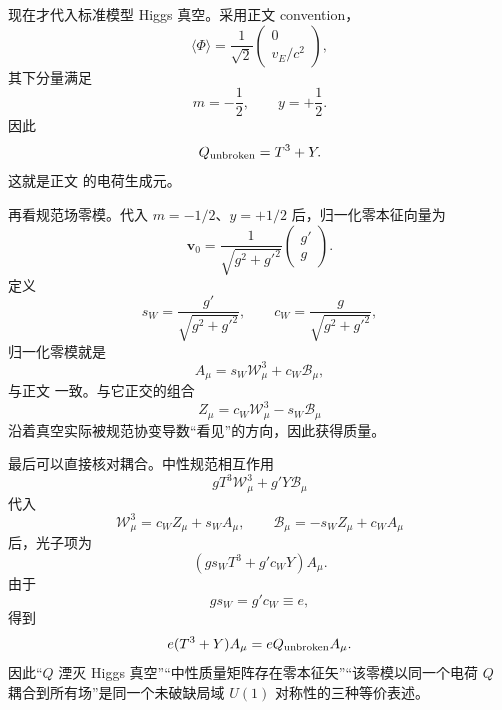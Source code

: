 \begin{derivation}
现在才代入标准模型 Higgs 真空。采用正文 convention，
\[
\langle\Phi\rangle
=
\frac1{\sqrt2}
\begin{pmatrix}0\\v_E/c^2\end{pmatrix},
\]
其下分量满足
\[
m=-\frac12,
\qquad
y=+\frac12.
\]
因此
\[
Q_{\rm unbroken}
=
T^3+Y.
\]
这就是正文 的电荷生成元。

再看规范场零模。代入 $m=-1/2$、$y=+1/2$ 后，归一化零本征向量为
\[
\mathbf v_0
=\frac1{\sqrt{g^2+g'^2}}
\begin{pmatrix}g'\\g\end{pmatrix}.
\]
定义
\[
s_W
=
\frac{g'}{\sqrt{g^2+g'^2}},
\qquad
c_W
=
\frac{g}{\sqrt{g^2+g'^2}},
\]
归一化零模就是
\[
A_\mu
=
s_W\mathcal W_\mu^3
+
c_W\mathcal B_\mu,
\]
与正文 一致。与它正交的组合
\[
Z_\mu
=
c_W\mathcal W_\mu^3
-
s_W\mathcal B_\mu
\]
沿着真空实际被规范协变导数“看见”的方向，因此获得质量。

最后可以直接核对耦合。中性规范相互作用
\[
gT^3\mathcal W_\mu^3
+
g'Y\mathcal B_\mu
\]
代入
\[
\mathcal W_\mu^3=c_WZ_\mu+s_WA_\mu,
\qquad
\mathcal B_\mu=-s_WZ_\mu+c_WA_\mu
\]
后，光子项为
\[
\left(
gs_WT^3+g'c_WY
\right)A_\mu.
\]
由于
\[
gs_W=g'c_W
\equiv e,
\]
得到
\[
e(T^3+Y)A_\mu
=
eQ_{\rm unbroken}A_\mu.
\]
因此“\(Q\) 湮灭 Higgs 真空”“中性质量矩阵存在零本征矢”“该零模以同一个电荷 \(Q\) 耦合到所有场”是同一个未破缺局域 \(U(1)\) 对称性的三种等价表述。
\end{derivation}
